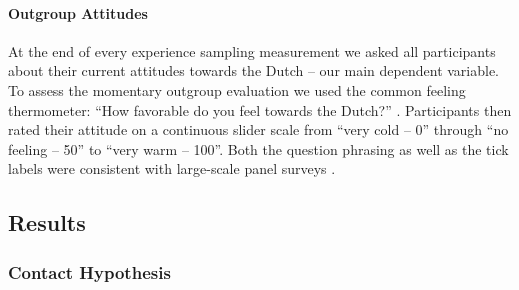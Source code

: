 \paragraph{Outgroup Attitudes}

At the end of every experience sampling measurement we asked all
participants about their current attitudes towards the Dutch -- our main
dependent variable. To assess the momentary outgroup evaluation we used
the common feeling thermometer: ``How favorable do you feel towards the
Dutch?'' \citep[][]{Lavrakas2008}. Participants then rated their
attitude on a continuous slider scale from ``very cold -- 0'' through
``no feeling -- 50'' to ``very warm -- 100''. Both the question phrasing
as well as the tick labels were consistent with large-scale panel
surveys \citep[e.g.,][]{DeBell2010}.

\subsection{Results}

\subsubsection{Contact Hypothesis}

